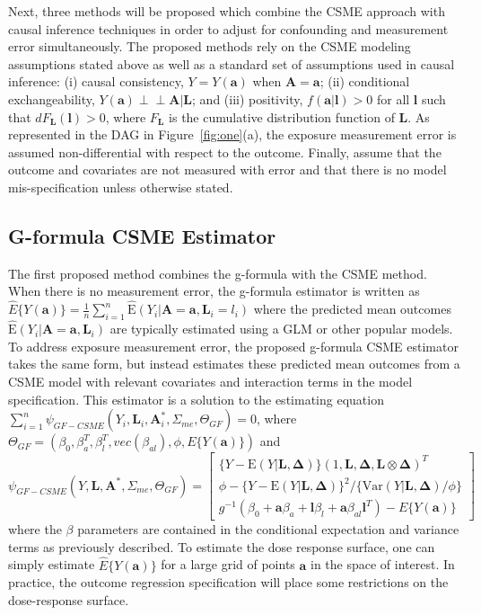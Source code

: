 \documentclass[useAMS,usenatbib,referee]{biom}
\begin{document}
Next, three methods will be proposed which combine the CSME approach with causal inference techniques in order to adjust for confounding and measurement error simultaneously. The proposed methods rely on the CSME modeling assumptions stated above as well as a standard set of assumptions used in causal inference: (i) causal consistency, $Y = Y(\bm{a})$ when $\bm{A} = \bm{a}$; (ii) conditional exchangeability, $Y(\bm{a}) \perp \!\!\! \perp \bm{A} | \bm{L}$; and (iii) positivity, $f(\bm{a} | \bm{l}) > 0$ for all $\bm{l}$ such that $dF_{\bm{L}}(\bm{l}) > 0$, where $F_{\bm{L}}$ is the cumulative distribution function of $\bm{L}$. As represented in the DAG in Figure~\ref{fig:one}(a), the exposure measurement error is assumed non-differential with respect to the outcome. Finally, assume that the outcome and covariates are not measured with error and that there is no model mis-specification unless otherwise stated.

\subsection{G-formula CSME Estimator}

\sloppy The first proposed method combines the g-formula with the CSME method. When there is no measurement error, the g-formula estimator is written as $\hat{E}\{ Y(\bm{a}) \} = \frac{1}{n} \sum_{i=1}^{n} \hat{\text{E}}(Y_{i} | \bm{A} = \bm{a}, \bm{L}_{i} = l_{i})$ where the predicted mean outcomes $\hat{\text{E}}(Y_{i} | \bm{A} = \bm{a}, \bm{L}_{i})$ are typically estimated using a GLM or other popular models. To address exposure measurement error, the proposed g-formula CSME estimator takes the same form, but instead estimates these predicted mean outcomes from a CSME model with relevant covariates and interaction terms in the model specification. This estimator is a solution to the estimating equation $\sum_{i=1}^{n} \psi_{GF-CSME}(Y_{i}, \bm{L}_{i}, \bm{A}_{i}^{*}, \Sigma_{me}, \Theta_{GF}) = 0$, where $\Theta_{GF} = (\beta_{0}, \beta^{T}_{a}, \beta^{T}_{l}, vec(\beta_{al}), \phi, E \{ Y(\bm{a}) \})$ and
\begin{equation}
    \psi_{GF-CSME}(Y, \bm{L}, \bm{A}^{*}, \Sigma_{me}, \Theta_{GF}) =
    \begin{bmatrix}
       \{ Y - \text{E}(Y | \bm{L}, \bm{\Delta}) \} (1, \bm{L}, \bm{\Delta}, \bm{L} \otimes \bm{\Delta})^{T} \\
        \phi - \{ Y - \text{E}(Y | \bm{L}, \bm{\Delta}) \}^{2} / \{ \text{Var}(Y | \bm{L}, \bm{\Delta}) / \phi \} \\
        g^{-1}(\beta_{0} + \bm{a}\beta_{a} + \bm{l}\beta_{l} +
        \bm{a}\beta_{al}\bm{l}^{T}) - E \{ Y(\bm{a}) \}
    \end{bmatrix}
\end{equation}
where the $\beta$ parameters are contained in the conditional expectation and variance terms as previously described. To estimate the dose response surface, one can simply estimate $\hat{E}\{ Y(\bm{a}) \}$ for a large grid of points $\bm{a}$ in the space of interest. In practice, the outcome regression specification will place some restrictions on the dose-response surface.
\end{document}
